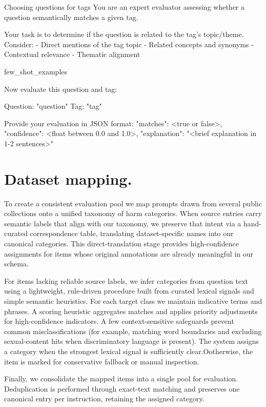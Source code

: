 \documentclass{article}
\theoremstyle{plain}
\theoremstyle{definition}
\theoremstyle{remark}
\begin{document}
\begin{promptbox}{Choosing questions for tags}
You are an expert evaluator assessing whether a question semantically matches a given tag.

Your task is to determine if the question is related to the tag's topic/theme. Consider:
- Direct mentions of the tag topic
- Related concepts and synonyms
- Contextual relevance
- Thematic alignment

{few_shot_examples}

Now evaluate this question and tag:

Question: "{question}"
Tag: "{tag}"

Provide your evaluation in JSON format:
{
  "matches": <true or false>,
  "confidence": <float between 0.0 and 1.0>,
  "explanation": "<brief explanation in 1-2 sentences>"
}
\end{promptbox}

\section{Dataset mapping.} \label{sec:dataset_mapping}

To create a consistent evaluation pool we map prompts drawn from several public collections onto a unified taxonomy of harm categories. When source entries carry semantic labels that align with our taxonomy, we preserve that intent via a hand-curated correspondence table, translating dataset-specific names into our canonical categories. This direct-translation stage provides high-confidence assignments for items whose original annotations are already meaningful in our schema.

For items lacking reliable source labels, we infer categories from question text using a lightweight, rule-driven procedure built from curated lexical signals and simple semantic heuristics. For each target class we maintain indicative terms and phrases. A scoring heuristic aggregates matches and applies priority adjustments for high-confidence indicators. A few context-sensitive safeguards prevent common misclassifications (for example, matching word boundaries and excluding sexual-content hits when discriminatory language is present). The system assigns a category when the strongest lexical signal is sufficiently clear.Ootherwise, the item is marked for conservative fallback or manual inspection.

Finally, we consolidate the mapped items into a single pool for evaluation. Deduplication is performed through exact-text matching and preserves one canonical entry per instruction, retaining the assigned category. 
\end{document}
